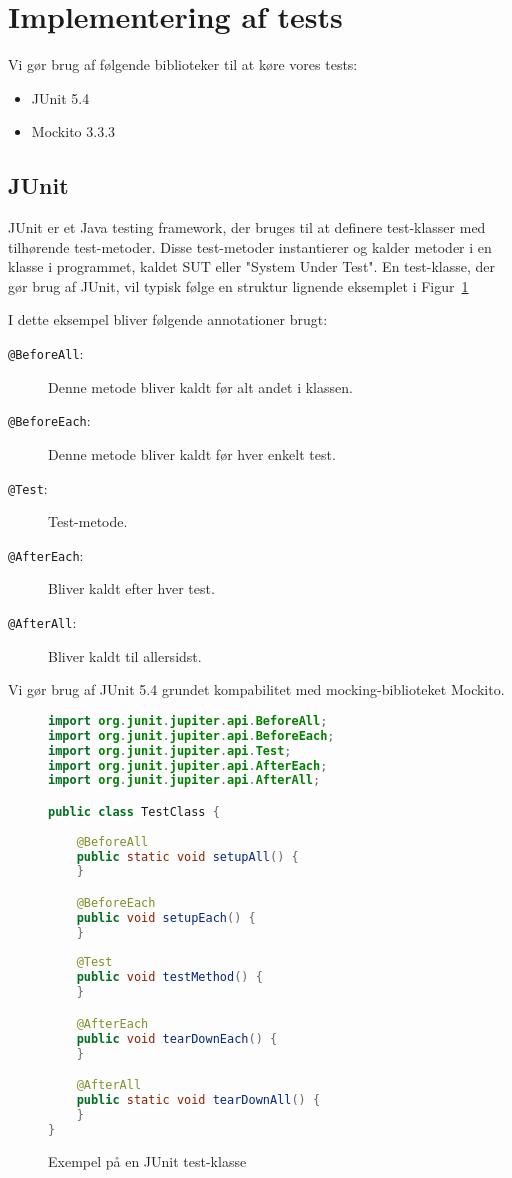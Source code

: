 
\section{Implementering af tests}
Vi gør brug af følgende biblioteker til at køre vores tests:
\begin{itemize}
    \item JUnit 5.4
    \item Mockito 3.3.3
\end{itemize}

\subsection{JUnit}
JUnit er et Java testing framework, der bruges til at definere test-klasser med tilhørende test-metoder. Disse test-metoder instantierer og kalder metoder i en klasse i programmet, kaldet SUT eller "System Under Test". En test-klasse, der gør brug af JUnit, vil typisk følge en struktur lignende eksemplet i Figur~\ref{fig:JUnitEksempel}

I dette eksempel bliver følgende annotationer brugt: 
\begin{description}
    \item[\texttt{@BeforeAll}:] Denne metode bliver kaldt før alt andet i klassen.
    \item[\texttt{@BeforeEach}:] Denne metode bliver kaldt før hver enkelt test.
    \item[\texttt{@Test}:] Test-metode.
    \item[\texttt{@AfterEach}:] Bliver kaldt efter hver test.
    \item[\texttt{@AfterAll}:] Bliver kaldt til allersidst.      
\end{description}

Vi gør brug af JUnit 5.4 grundet kompabilitet med mocking-biblioteket Mockito.

\begin{figure}
    \begin{lstlisting}[language=Java]
import org.junit.jupiter.api.BeforeAll;
import org.junit.jupiter.api.BeforeEach;
import org.junit.jupiter.api.Test;
import org.junit.jupiter.api.AfterEach;
import org.junit.jupiter.api.AfterAll;

public class TestClass {
    
    @BeforeAll
    public static void setupAll() {
    }

    @BeforeEach
    public void setupEach() {
    }
    
    @Test
    public void testMethod() {
    }

    @AfterEach
    public void tearDownEach() {
    }

    @AfterAll
    public static void tearDownAll() {
    }
}
    \end{lstlisting}
    \caption{Exempel på en JUnit test-klasse\label{fig:JUnitEksempel}}
\end{figure}


